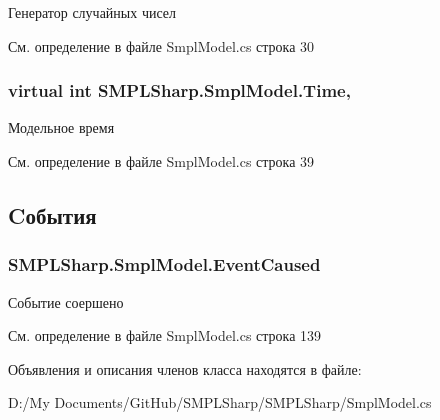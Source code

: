 Генератор случайных чисел 



См. определение в файле Smpl\-Model.\-cs строка 30

\hypertarget{class_s_m_p_l_sharp_1_1_smpl_model_a091e0759cad46e82a02ff253a232a37d}{
\subsubsection[{Time}]{\setlength{\rightskip}{0pt plus 5cm}virtual int S\-M\-P\-L\-Sharp.\-Smpl\-Model.\-Time\hspace{0.3cm}{\ttfamily [get]}, {\ttfamily [set]}}}\label{df/d34/class_s_m_p_l_sharp_1_1_smpl_model_a091e0759cad46e82a02ff253a232a37d}


Модельное время 



См. определение в файле Smpl\-Model.\-cs строка 39



\subsection{Cобытия}
\hypertarget{class_s_m_p_l_sharp_1_1_smpl_model_abfa9344a73f4845e02be97fd5b963ed3}{
\subsubsection[{Event\-Caused}]{ S\-M\-P\-L\-Sharp.\-Smpl\-Model.\-Event\-Caused}}\label{df/d34/class_s_m_p_l_sharp_1_1_smpl_model_abfa9344a73f4845e02be97fd5b963ed3}


Событие соершено 



См. определение в файле Smpl\-Model.\-cs строка 139



Объявления и описания членов класса находятся в файле\-:\begin{DoxyCompactItemize}
\item 
D\-:/\-My Documents/\-Git\-Hub/\-S\-M\-P\-L\-Sharp/\-S\-M\-P\-L\-Sharp/Smpl\-Model.\-cs\end{DoxyCompactItemize}
